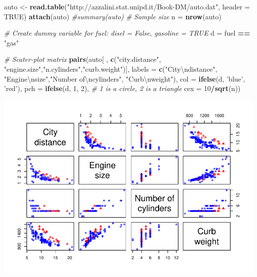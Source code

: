 \documentclass[]{article}
\newenvironment{Shaded}{\begin{snugshade}}{\end{snugshade}}
\newcommand{\KeywordTok}[1]{\textcolor[rgb]{0.13,0.29,0.53}{\textbf{#1}}}
\newcommand{\DataTypeTok}[1]{\textcolor[rgb]{0.13,0.29,0.53}{#1}}
\newcommand{\DecValTok}[1]{\textcolor[rgb]{0.00,0.00,0.81}{#1}}
\newcommand{\CharTok}[1]{\textcolor[rgb]{0.31,0.60,0.02}{#1}}
\newcommand{\StringTok}[1]{\textcolor[rgb]{0.31,0.60,0.02}{#1}}
\newcommand{\CommentTok}[1]{\textcolor[rgb]{0.56,0.35,0.01}{\textit{#1}}}
\newcommand{\OtherTok}[1]{\textcolor[rgb]{0.56,0.35,0.01}{#1}}
\newcommand{\OperatorTok}[1]{\textcolor[rgb]{0.81,0.36,0.00}{\textbf{#1}}}
\newcommand{\NormalTok}[1]{#1}
\begin{document}
\begin{Shaded}
\begin{Highlighting}[]
\NormalTok{auto <-}\StringTok{ }\KeywordTok{read.table}\NormalTok{(}\StringTok{"http://azzalini.stat.unipd.it/Book-DM/auto.dat"}\NormalTok{, }\DataTypeTok{header =} \OtherTok{TRUE}\NormalTok{)}
\KeywordTok{attach}\NormalTok{(auto)}
\CommentTok{#summary(auto)}
\CommentTok{# Sample size}
\NormalTok{n =}\StringTok{ }\KeywordTok{nrow}\NormalTok{(auto)}

\CommentTok{# Create dummy variable for fuel: disel = False, gasoline = TRUE}
\NormalTok{d =}\StringTok{ }\NormalTok{fuel }\OperatorTok{==}\StringTok{ "gas"}


\CommentTok{# Scater-plot matrix}
\KeywordTok{pairs}\NormalTok{(auto[ , }\KeywordTok{c}\NormalTok{(}\StringTok{"city.distance"}\NormalTok{, }\StringTok{"engine.size"}\NormalTok{,}\StringTok{"n.cylinders"}\NormalTok{,}\StringTok{"curb.weight"}\NormalTok{)],     }
      \DataTypeTok{labels =} \KeywordTok{c}\NormalTok{(}\StringTok{"City}\CharTok{\textbackslash{}n}\StringTok{distance"}\NormalTok{, }\StringTok{"Engine}\CharTok{\textbackslash{}n}\StringTok{size"}\NormalTok{,}\StringTok{"Number of}\CharTok{\textbackslash{}n}\StringTok{cylinders"}\NormalTok{, }\StringTok{"Curb}\CharTok{\textbackslash{}n}\StringTok{weight"}\NormalTok{),}
      \DataTypeTok{col =} \KeywordTok{ifelse}\NormalTok{(d, }\StringTok{'blue'}\NormalTok{, }\StringTok{'red'}\NormalTok{), }\DataTypeTok{pch =} \KeywordTok{ifelse}\NormalTok{(d, }\DecValTok{1}\NormalTok{, }\DecValTok{2}\NormalTok{), }\CommentTok{# 1 is a circle, 2 is a triangle}
      \DataTypeTok{cex =} \DecValTok{10}\OperatorTok{/}\KeywordTok{sqrt}\NormalTok{(n))}
\end{Highlighting}
\end{Shaded}

\includegraphics{fromBook_files/figure-latex/unnamed-chunk-1-1.pdf}
\end{document}
